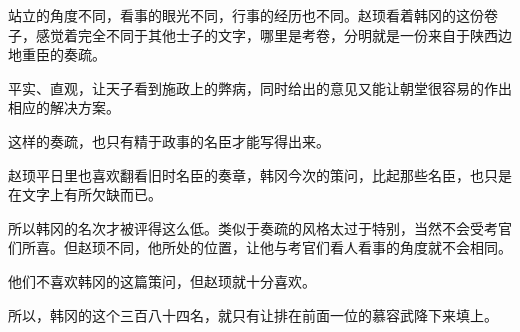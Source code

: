 站立的角度不同，看事的眼光不同，行事的经历也不同。赵顼看着韩冈的这份卷子，感觉着完全不同于其他士子的文字，哪里是考卷，分明就是一份来自于陕西边地重臣的奏疏。

平实、直观，让天子看到施政上的弊病，同时给出的意见又能让朝堂很容易的作出相应的解决方案。

这样的奏疏，也只有精于政事的名臣才能写得出来。

赵顼平日里也喜欢翻看旧时名臣的奏章，韩冈今次的策问，比起那些名臣，也只是在文字上有所欠缺而已。

所以韩冈的名次才被评得这么低。类似于奏疏的风格太过于特别，当然不会受考官们所喜。但赵顼不同，他所处的位置，让他与考官们看人看事的角度就不会相同。

他们不喜欢韩冈的这篇策问，但赵顼就十分喜欢。

所以，韩冈的这个三百八十四名，就只有让排在前面一位的慕容武降下来填上。

